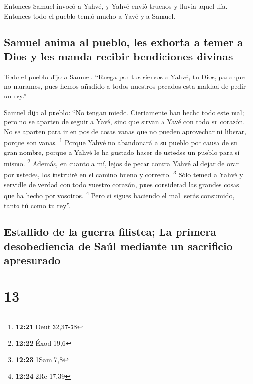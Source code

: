  Entonces Samuel invocó a Yahvé, y Yahvé envió truenos y
lluvia aquel día. Entonces todo el pueblo temió mucho a Yavé y a Samuel.

\hypertarget{samuel-anima-al-pueblo-les-exhorta-a-temer-a-dios-y-les-manda-recibir-bendiciones-divinas}{%
\subsection{Samuel anima al pueblo, les exhorta a temer a Dios y les
manda recibir bendiciones
divinas}\label{samuel-anima-al-pueblo-les-exhorta-a-temer-a-dios-y-les-manda-recibir-bendiciones-divinas}}

 Todo el pueblo dijo a Samuel: ``Ruega por tus siervos a
Yahvé, tu Dios, para que no muramos, pues hemos añadido a todos nuestros
pecados esta maldad de pedir un rey.''

 Samuel dijo al pueblo: ``No tengan miedo. Ciertamente
han hecho todo este mal; pero no se aparten de seguir a Yavé, sino que
sirvan a Yavé con todo su corazón.  No se aparten para ir
en pos de cosas vanas que no pueden aprovechar ni liberar, porque son
vanas. \footnote{\textbf{12:21} Deut 32,37-38}  Porque
Yahvé no abandonará a su pueblo por causa de su gran nombre, porque a
Yahvé le ha gustado hacer de ustedes un pueblo para sí mismo.
\footnote{\textbf{12:22} Éxod 19,6}  Además, en cuanto a
mí, lejos de pecar contra Yahvé al dejar de orar por ustedes, los
instruiré en el camino bueno y correcto. \footnote{\textbf{12:23} 1Sam
  7,8}  Sólo temed a Yahvé y servidle de verdad con todo
vuestro corazón, pues considerad las grandes cosas que ha hecho por
vosotros. \footnote{\textbf{12:24} 2Re 17,39}  Pero si
sigues haciendo el mal, serás consumido, tanto tú como tu rey''.

\hypertarget{estallido-de-la-guerra-filistea-la-primera-desobediencia-de-sauxfal-mediante-un-sacrificio-apresurado}{%
\subsection{Estallido de la guerra filistea; La primera desobediencia de
Saúl mediante un sacrificio
apresurado}\label{estallido-de-la-guerra-filistea-la-primera-desobediencia-de-sauxfal-mediante-un-sacrificio-apresurado}}

\hypertarget{section-12}{%
\section{13}\label{section-12}}

